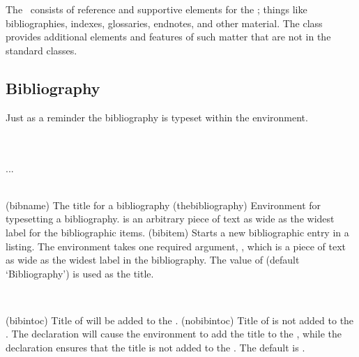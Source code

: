 \chapter{\prBackmatter} \label{chap:backmatter}

The \pixbackmatter\ consists of reference and supportive elements for 
the \pixmainmatter;
things like bibliographies, indexes, glossaries, endnotes, and other
material. The class provides additional elements and features of such 
matter that are not in the standard classes.

\section{Bibliography} \label{sec:xref:bibliography}


Just as a reminder the bibliography is typeset within the 
 environment.
\begin{syntax}
\cmd{\bibname} \\
 \\
\cmd{\bibitem} ... \\
 \\
\end{syntax}
\glossary(bibname)%
  {}%
  {The title for a bibliography}
\glossary(thebibliography)%
  {}%
  {Environment for typesetting a bibliography.  is an arbitrary
    piece of text as wide as the widest label for the bibliographic items.}
\glossary(bibitem)%
  {}%
  {Starts a new bibliographic entry in a  listing.}
The environment takes one required argument, , which is a 
piece of text
as wide as the widest label in the bibliography. The value of 
\cmd{\bibname} (default `Bibliography') is used
as the title. 

\begin{syntax}
\cmd{\bibintoc} \cmd{\nobibintoc} \\
\end{syntax}
\glossary(bibintoc)%
  {}%
  {Title of  will be added to the \prtoc.}
\glossary(nobibintoc)%
  {}%
  {Title of  is not added to the \prtoc.}
The declaration \cmd{\bibintoc} will cause the 
environment to add the title to 
the \toc, while the declaration
\cmd{\nobibintoc} ensures that the title is not added to the \toc. 
The default is \cmd{\bibintoc}.

